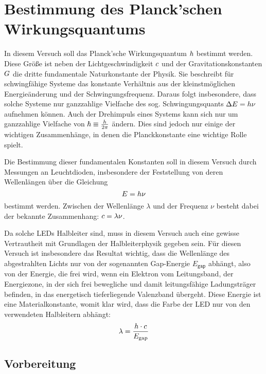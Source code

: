 \chapter{Bestimmung des Planck'schen Wirkungsquantums}
In diesem Versuch soll das Planck'sche Wirkungsquantum $h$ bestimmt werden. Diese Größe ist neben der Lichtgeschwindigkeit $c$ und der Gravitationskonstanten $G$ die dritte fundamentale Naturkonstante der Physik. Sie beschreibt für schwingfähige Systeme das konstante Verhältnis aus der kleinstmöglichen Energieänderung und der Schwingungsfrequenz. Daraus folgt insbesondere, dass solche Systeme nur ganzzahlige Vielfache des sog. Schwingungsquants $\Delta E=h\nu$ aufnehmen können. Auch der Drehimpuls eines Systems kann sich nur um ganzzahlige Vielfache von $\hbar\equiv\frac{h}{2\pi}$ ändern. Dies sind jedoch nur einige der wichtigen Zusammenhänge, in denen die Planckkonstante eine wichtige Rolle spielt.

Die Bestimmung dieser fundamentalen Konstanten soll in diesem Versuch durch Messungen an Leuchtdioden, insbesondere der Feststellung von deren Wellenlängen über die Gleichung 
\begin{equation}
	E=h\nu
\end{equation}
bestimmt werden. Zwischen der Wellenlänge $\lambda$ und der Frequenz $\nu$ besteht dabei der bekannte Zusammenhang: $c=\lambda\nu$.

Da solche LEDs Halbleiter sind, muss in diesem Versuch auch eine gewisse Vertrautheit mit Grundlagen der Halbleiterphysik gegeben sein. Für diesen Versuch ist insbesondere das Resultat wichtig, dass die Wellenlänge des abgestrahlten Lichts nur von der sogenannten Gap-Energie $E_{\mathtt{gap}}$ abhängt, also von der Energie, die frei wird, wenn ein Elektron vom Leitungsband, der Energiezone, in der sich frei bewegliche und damit leitungsfähige Ladungsträger befinden, in das energetisch tieferliegende Valenzband übergeht. Diese Energie ist eine Materialkonstante, womit klar wird, dass die Farbe der LED nur von den verwendeten Halbleitern abhängt:
\begin{equation}
	\lambda=\frac{h\cdot c}{E_{\mathrm{gap}}}
\end{equation}
\section{Vorbereitung}
